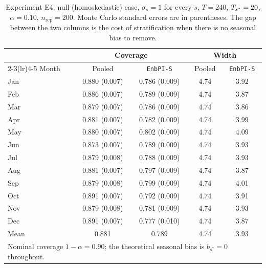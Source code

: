 \begin{table}[ht]
\centering
\small
\caption{Experiment E4: null (homoskedastic) case,
         $\sigma_s = 1$ for every $s$, $T = 240$,
         $T_{s^*} = 20$, $\alpha = 0.10$,
         $n_{\mathrm{rep}} = 200$.  Monte Carlo standard errors
         are in parentheses.  The gap between the two columns is
         the cost of stratification when there is no seasonal
         bias to remove.}
\label{tab:e4_null}
\begin{tabular}{l cc cc}
\toprule
 & \multicolumn{2}{c}{Coverage} & \multicolumn{2}{c}{Width} \\
\cmidrule(lr){2-3}\cmidrule(lr){4-5}
Month & Pooled & \texttt{EnbPI-S} & Pooled & \texttt{EnbPI-S} \\
\midrule
Jan & 0.880 (0.007) & 0.786 (0.009) & 4.74 & 3.92 \\
Feb & 0.886 (0.007) & 0.789 (0.009) & 4.74 & 3.87 \\
Mar & 0.879 (0.007) & 0.786 (0.009) & 4.74 & 3.86 \\
Apr & 0.881 (0.007) & 0.782 (0.009) & 4.74 & 3.99 \\
May & 0.880 (0.007) & 0.802 (0.009) & 4.74 & 4.09 \\
Jun & 0.873 (0.007) & 0.789 (0.009) & 4.74 & 3.93 \\
Jul & 0.879 (0.008) & 0.788 (0.009) & 4.74 & 3.93 \\
Aug & 0.881 (0.007) & 0.797 (0.009) & 4.74 & 3.87 \\
Sep & 0.879 (0.008) & 0.799 (0.009) & 4.74 & 4.01 \\
Oct & 0.891 (0.007) & 0.792 (0.009) & 4.74 & 3.91 \\
Nov & 0.879 (0.008) & 0.781 (0.009) & 4.74 & 3.93 \\
Dec & 0.891 (0.007) & 0.777 (0.010) & 4.74 & 3.87 \\
\midrule
Mean & 0.881 & 0.789 & 4.74 & 3.93 \\
\bottomrule
\multicolumn{5}{l}{\footnotesize Nominal coverage $1-\alpha = 0.90$; the theoretical seasonal bias is $b_{s^*} = 0$ throughout.}\\
\end{tabular}
\end{table}
